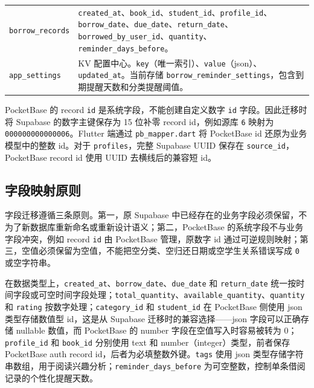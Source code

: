 \begin{table}[!htbp]
\begin{tabularx}{0.95\textwidth}{l>{\RaggedRight\arraybackslash}X}
        \texttt{borrow\_records} & \texttt{created\_at}、\texttt{book\_id}、\texttt{student\_id}、\texttt{profile\_id}、\texttt{borrow\_date}、\texttt{due\_date}、\texttt{return\_date}、\texttt{borrowed\_by\_user\_id}、\texttt{quantity}、\texttt{reminder\_days\_before}。                                                                        \\
        \texttt{app\_settings}   & KV 配置中心。\texttt{key}（唯一索引）、\texttt{value}（json）、\texttt{updated\_at}。当前存储 \texttt{borrow\_reminder\_settings}，包含到期提醒天数和分类提醒阈值。                                                                                                                                                                            \\
        \bottomrule
    \end{tabularx}
\end{table}

PocketBase 的 record \texttt{id} 是系统字段，不能创建自定义数字 \texttt{id} 字段。因此迁移时将 Supabase 的数字主键保存为 15 位补零 record id，例如源库 \texttt{6} 映射为 \texttt{000000000000006}。Flutter 端通过 \texttt{pb\_mapper.dart} 将 PocketBase id 还原为业务模型中的整数 id。对于 \texttt{profiles}，完整 Supabase UUID 保存在 \texttt{source\_id}，PocketBase record id 使用 UUID 去横线后的兼容短 id。

\subsection{字段映射原则}

字段迁移遵循三条原则。第一，原 Supabase 中已经存在的业务字段必须保留，不为了新数据库重新命名或重新设计语义；第二，PocketBase 的系统字段不与业务字段冲突，例如 record \texttt{id} 由 PocketBase 管理，原数字 id 通过可逆规则映射；第三，空值必须保留为空值，不能把空分类、空归还日期或空学生关系错误写成 \texttt{0} 或空字符串。

在数据类型上，\texttt{created\_at}、\texttt{borrow\_date}、\texttt{due\_date} 和 \texttt{return\_date} 统一按时间字段或可空时间字段处理；\texttt{total\_quantity}、\texttt{available\_quantity}、\texttt{quantity} 和 \texttt{rating} 按数字处理；\texttt{category\_id} 和 \texttt{student\_id} 在 PocketBase 侧使用 json 类型存储数值型 id，这是从 Supabase 迁移时的兼容选择——json 字段可以正确存储 nullable 数值，而 PocketBase 的 number 字段在空值写入时容易被转为 0；\texttt{profile\_id} 和 \texttt{book\_id} 分别使用 text 和 number（integer）类型，前者保存 PocketBase auth record id，后者为必填整数外键。\texttt{tags} 使用 json 类型存储字符串数组，用于阅读兴趣分析；\texttt{reminder\_days\_before} 为可空整数，控制单条借阅记录的个性化提醒天数。

